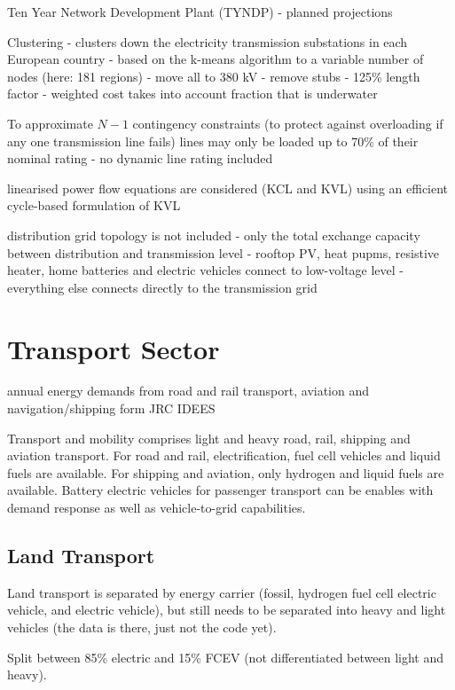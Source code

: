 Ten Year Network Development Plant (TYNDP)
- planned projections

Clustering
- clusters down the electricity transmission substations in each European country
- based on the k-means algorithm to a variable number of nodes (here: 181 regions)
- move all to 380 kV
- remove stubs
- 125\% length factor
- weighted cost takes into account fraction that is underwater

To approximate $N-1$ contingency constraints (to protect against overloading if any one
transmission line fails) lines may only be loaded up to 70\% of their nominal rating
- no dynamic line rating included

linearised power flow equations are considered (KCL and KVL) using an
efficient cycle-based formulation of KVL

distribution grid topology is not included
- only the total exchange capacity between distribution and transmission level
- rooftop PV, heat pupms, resistive heater, home batteries and electric vehicles connect to low-voltage level
- everything else connects directly to the transmission grid

\section{Transport Sector}

annual energy demands from road and rail transport, aviation and navigation/shipping form JRC IDEES 

Transport and mobility comprises light and heavy road, rail, shipping and
aviation transport. For road and rail, electrification, fuel cell vehicles and
liquid fuels are available. For shipping and aviation, only hydrogen and liquid
fuels are available. Battery electric vehicles for passenger transport can be
enables with demand response as well as vehicle-to-grid capabilities.

\subsection{Land Transport}

Land transport is separated by energy carrier (fossil, hydrogen fuel cell
electric vehicle, and electric vehicle), but still needs to be separated into
heavy and light vehicles (the data is there, just not the code yet).

Split between 85\% electric and 15\% FCEV (not differentiated between light and heavy).

